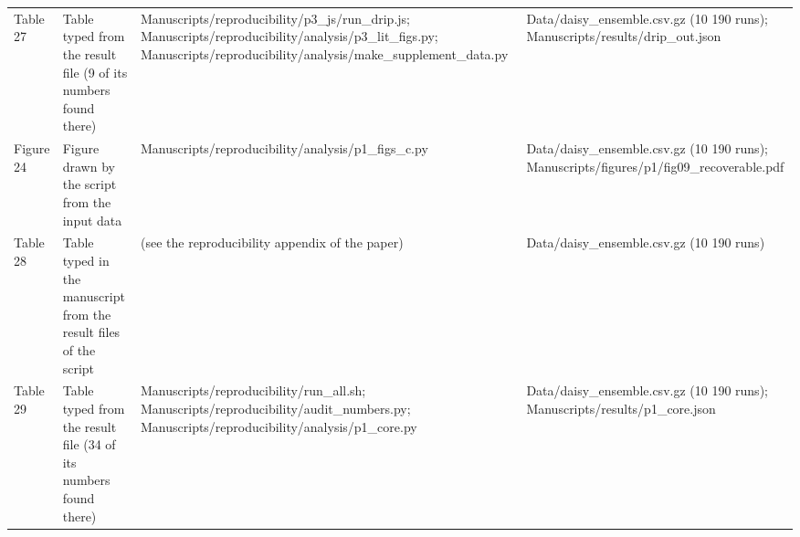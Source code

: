 {\begin{longtable}{p{}p{}p{}p{}}
{}Table 27 & Table typed from the result file (9 of its numbers found there) & Manuscripts/\allowbreak{}reproducibility/\allowbreak{}p3\_\allowbreak{}js/\allowbreak{}run\_\allowbreak{}drip.js;  Manuscripts/\allowbreak{}reproducibility/\allowbreak{}analysis/\allowbreak{}p3\_\allowbreak{}lit\_\allowbreak{}figs.py;  Manuscripts/\allowbreak{}reproducibility/\allowbreak{}analysis/\allowbreak{}make\_\allowbreak{}supplement\_\allowbreak{}data.py & Data/\allowbreak{}daisy\_\allowbreak{}ensemble.csv.gz (10 190 runs);  Manuscripts/\allowbreak{}results/\allowbreak{}drip\_\allowbreak{}out.json\\
{}Figure 24 & Figure drawn by the script from the input data & Manuscripts/\allowbreak{}reproducibility/\allowbreak{}analysis/\allowbreak{}p1\_\allowbreak{}figs\_\allowbreak{}c.py & Data/\allowbreak{}daisy\_\allowbreak{}ensemble.csv.gz (10 190 runs);  Manuscripts/\allowbreak{}figures/\allowbreak{}p1/\allowbreak{}fig09\_\allowbreak{}recoverable.pdf\\
{}Table 28 & Table typed in the manuscript from the result files of the script & (see the reproducibility appendix of the paper) & Data/\allowbreak{}daisy\_\allowbreak{}ensemble.csv.gz (10 190 runs)\\
{}Table 29 & Table typed from the result file (34 of its numbers found there) & Manuscripts/\allowbreak{}reproducibility/\allowbreak{}run\_\allowbreak{}all.sh;  Manuscripts/\allowbreak{}reproducibility/\allowbreak{}audit\_\allowbreak{}numbers.py;  Manuscripts/\allowbreak{}reproducibility/\allowbreak{}analysis/\allowbreak{}p1\_\allowbreak{}core.py & Data/\allowbreak{}daisy\_\allowbreak{}ensemble.csv.gz (10 190 runs);  Manuscripts/\allowbreak{}results/\allowbreak{}p1\_\allowbreak{}core.json\\
\bottomrule\end{longtable}}
